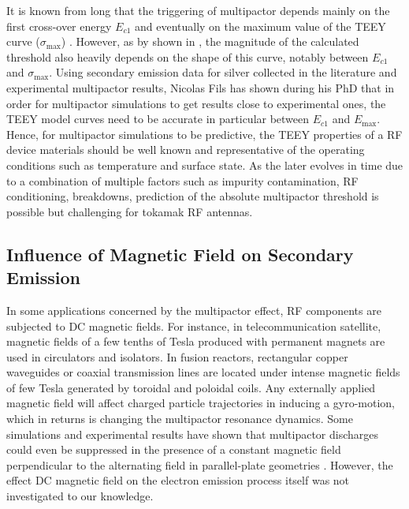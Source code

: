 It is known from long that the triggering of multipactor depends mainly on the first cross-over energy  $E_{c1}$ and eventually on the maximum value of the TEEY curve ($\sigma_{\max}$) . However, as by shown in , the magnitude of the calculated threshold also heavily depends on the shape of this curve, notably between $E_{c1}$ and $\sigma_{\max}$. Using secondary emission data for silver collected in the literature and experimental multipactor results, Nicolas Fils has shown during his PhD that in order for multipactor simulations to get results close to experimental ones, the TEEY model curves need to be accurate in particular between $E_{c1}$ and $E_{\max}$. Hence, for multipactor simulations to be predictive, the TEEY properties of a RF device materials should be well known and representative of the operating conditions such as temperature and surface state. As the later evolves in time due to a combination of multiple factors such as impurity contamination, RF conditioning, breakdowns, prediction of the absolute multipactor threshold is possible but challenging for tokamak RF antennas.

\subsection[Influence of Magnetic Field]{Influence of Magnetic Field on Secondary Emission}\label{sec:multipactor_magnetic_field}
In some applications concerned by the multipactor effect, RF components are subjected to DC magnetic fields. For instance, in telecommunication satellite, magnetic fields of a few tenths of Tesla produced with permanent magnets are used in circulators and isolators. In fusion reactors, rectangular copper waveguides or coaxial transmission lines are located under intense magnetic fields of few Tesla generated by toroidal and poloidal coils. Any externally applied magnetic field will affect charged particle trajectories in inducing a gyro-motion, which in returns is changing the multipactor resonance dynamics. Some simulations and experimental results have  shown that multipactor discharges could even be suppressed in the presence of a constant magnetic field perpendicular to the alternating field in parallel-plate geometries . However, the effect DC magnetic field on the electron emission process itself was not investigated to our knowledge.

